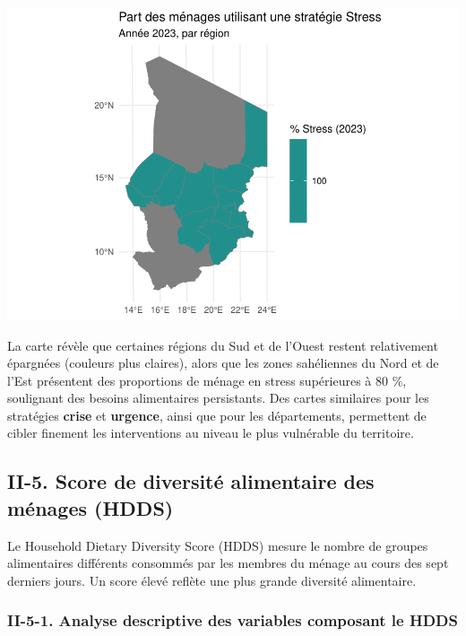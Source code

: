 \documentclass[
]{article}
\begin{document}
\includegraphics{Rapport_PAN_files/figure-latex/LhCSI_map-1.pdf}

La carte révèle que certaines régions du Sud et de l'Ouest restent
relativement épargnées (couleurs plus claires), alors que les zones
sahéliennes du Nord et de l'Est présentent des proportions de ménage en
stress supérieures à 80 \%, soulignant des besoins alimentaires
persistants. Des cartes similaires pour les stratégies \textbf{crise} et
\textbf{urgence}, ainsi que pour les départements, permettent de cibler
finement les interventions au niveau le plus vulnérable du territoire.

\hypertarget{ii-5.-score-de-diversituxe9-alimentaire-des-muxe9nages-hdds}{%
\subsection{II-5. Score de diversité alimentaire des ménages
(HDDS)}\label{ii-5.-score-de-diversituxe9-alimentaire-des-muxe9nages-hdds}}

Le Household Dietary Diversity Score (HDDS) mesure le nombre de groupes
alimentaires différents consommés par les membres du ménage au cours des
sept derniers jours. Un score élevé reflète une plus grande diversité
alimentaire.

\hypertarget{ii-5-1.-analyse-descriptive-des-variables-composant-le-hdds}{%
\subsubsection{II-5-1. Analyse descriptive des variables composant le
HDDS}\label{ii-5-1.-analyse-descriptive-des-variables-composant-le-hdds}}
\end{document}

